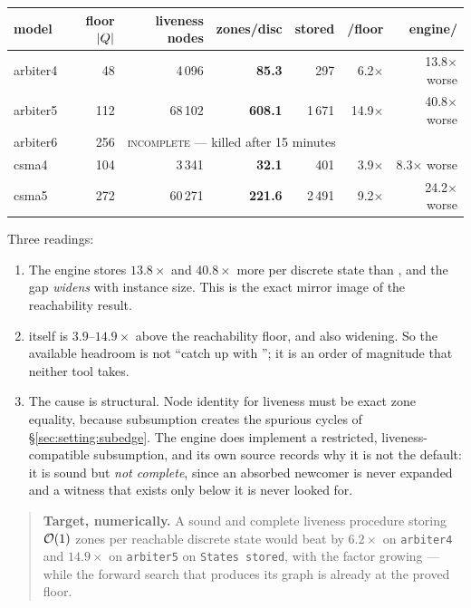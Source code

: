 \begin{center}\small
\begin{tabular}{lrrrrrr}
\toprule
model & floor $|Q|$ & liveness nodes & zones/disc & \uppaal{} stored & \uppaal{}/floor & engine/\uppaal{} \\
\midrule
arbiter4 & 48  & 4\,096  & \textbf{85.3}  & 297   & 6.2$\times$  & 13.8$\times$ worse \\
arbiter5 & 112 & 68\,102 & \textbf{608.1} & 1\,671& 14.9$\times$ & 40.8$\times$ worse \\
arbiter6 & 256 & \multicolumn{5}{l}{\textsc{incomplete} --- killed after 15 minutes} \\
csma4    & 104 & 3\,341  & \textbf{32.1}  & 401   & 3.9$\times$  & 8.3$\times$ worse \\
csma5    & 272 & 60\,271 & \textbf{221.6} & 2\,491& 9.2$\times$  & 24.2$\times$ worse \\
\bottomrule
\end{tabular}
\end{center}
\measured{}

Three readings:

\begin{enumerate}
  \item The engine stores $13.8\times$ and $40.8\times$ more per discrete state than \uppaal{}, and
        the gap \emph{widens} with instance size. This is the exact mirror image of the
        reachability result.
  \item \uppaal{} itself is $3.9$--$14.9\times$ above the reachability floor, and also widening. So
        the available headroom is not ``catch up with \uppaal{}''; it is an order of magnitude that
        neither tool takes.
  \item The cause is structural. Node identity for liveness must be exact zone equality, because
        subsumption creates the spurious cycles of \S\ref{sec:setting:subedge}. The engine does
        implement a restricted, liveness-compatible subsumption, and its own source records why it
        is not the default: it is sound but \emph{not complete}, since an absorbed newcomer is
        never expanded and a witness that exists only below it is never looked for.
\end{enumerate}

\begin{quote}
\textbf{Target, numerically.} A sound and complete liveness procedure storing $\mathcal{O}(1)$ zones per
reachable discrete state would beat \uppaal{} by $6.2\times$ on \texttt{arbiter4} and $14.9\times$
on \texttt{arbiter5} on \texttt{States stored}, with the factor growing --- while the forward search
that produces its graph is already at the proved floor.
\end{quote}


